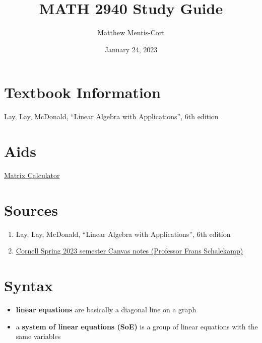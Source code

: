 \documentclass[a4paper,12pt]{article}
\title{MATH 2940 Study Guide}
\author{Matthew Mentis-Cort}
\date{January 24, 2023}
\theoremstyle{definition}
\theoremstyle{definition}
\begin{document}
	\maketitle
	
	\tableofcontents
	\newpage
	
	\section{Textbook Information}
	Lay, Lay, McDonald, “Linear Algebra with Applications”, 6th edition
	\section{Aids}
	\href{https://matrixcalc.org/}{Matrix Calculator}
	
	\section{Sources}
	\begin{enumerate}
		\item Lay, Lay, McDonald, “Linear Algebra with Applications”, 6th edition
		
		\item \href{https://canvas.cornell.edu/courses/48198}{Cornell Spring 2023 semester Canvas notes (Professor Frans Schalekamp)}
	\end{enumerate}
	\newpage
	
	\section{Syntax}
	\begin{itemize}
		\item \textbf{linear equations} are basically a diagonal line on a graph
		\item a \textbf{system of linear equations (SoE)} is a group of linear equations with the same variables
	\end{itemize}
\end{document}
